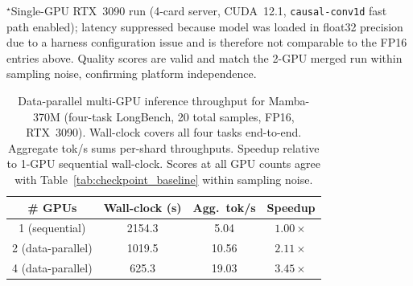 \begin{table}[h]
\centering
\caption{Checkpoint-level external baseline comparison on LongBench (20 samples/task, FP16). WikiText-103 and PG19 are teacher-forcing side perplexities; ``--'' means not collected. MF-EN exact-match is zero across all models because 32-token generation does not match gold strings under strict exact-match; this is expected and is not a harness defect. RTX~3090 per-sample latency is dominated by multi-process I/O overhead, not GPU compute.}
\label{tab:checkpoint_baseline}
\small
{}
{\scriptsize $^\star$Single-GPU RTX~3090 run (4-card server, CUDA~12.1, \texttt{causal-conv1d} fast path enabled); latency suppressed because model was loaded in float32 precision due to a harness configuration issue and is therefore not comparable to the FP16 entries above. Quality scores are valid and match the 2-GPU merged run within sampling noise, confirming platform independence.}
\end{table}

\begin{table}[!t]
\centering
\caption{Data-parallel multi-GPU inference throughput for Mamba-370M (four-task LongBench, 20 total samples, FP16, RTX~3090). Wall-clock covers all four tasks end-to-end. Aggregate tok/s sums per-shard throughputs. Speedup relative to 1-GPU sequential wall-clock. Scores at all GPU counts agree with Table~\ref{tab:checkpoint_baseline} within sampling noise.}
\label{tab:multigpu_scaling}
\small
\begin{tabular}{cccc}
\toprule
\# GPUs & Wall-clock (s) & Agg.\ tok/s & Speedup \\
\midrule
1 (sequential) & 2154.3 & 5.04 & $1.00\times$ \\
2 (data-parallel) & 1019.5 & 10.56 & $2.11\times$ \\
4 (data-parallel) & 625.3 & 19.03 & $3.45\times$ \\
\bottomrule
\end{tabular}
\end{table}


